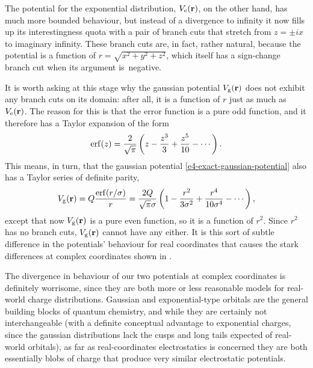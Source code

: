 The potential for the exponential distribution, $V_\mathrm{e}(\vb{r})$, on the other hand, has much more bounded behaviour, but instead of a divergence to infinity it now fills up its interestingness quota with a pair of branch cuts that stretch from $z=\pm i x$ to imaginary infinity. These branch cuts are, in fact, rather natural, because the potential is a function of $r=\sqrt{x^2+y^2+z^2}$, which itself has a sign-change branch cut when its argument is~negative. 


It is worth asking at this stage why the gaussian potential $V_\mathrm{g}(\vb{r})$ does not exhibit any branch cuts on its domain: after all, it is a function of $r$ just as much as $V_\mathrm{e}(\vb{r})$. The reason for this is that the error function is a pure odd function, and it therefore has a Taylor expansion  of the form
\begin{equation}
\erf(z)
=\frac{2}{\sqrt{\pi}}\left( z - \frac{z^3}{3} + \frac{z^5}{10} - \cdots \right)
.
\end{equation}
This means, in turn, that the gaussian potential \eqref{e4-exact-gaussian-potential} also has a Taylor series of definite parity,
\begin{equation}
\Vg(\vbr) 
=
Q \frac{ \erf(r/\sigma) }{ r }
=
\frac{2Q}{\sqrt{\pi}\sigma}\left( 1 - \frac{r^2}{3\sigma^2} + \frac{r^4}{10\sigma^4} - \cdots \right)
,
\end{equation}
except that now $V_\mathrm{g}(\vb{r})$ is a pure even function, so it is a function of $r^2$. Since $r^2$ has no branch cuts, $V_\mathrm{g}(\vb{r})$ cannot have any either. It is this sort of subtle difference in the potentials' behaviour for real coordinates that causes the stark differences at complex coordinates shown in .


The divergence in behaviour of our two potentials at complex coordinates is definitely worrisome, since they are both more or less reasonable models for real-world charge distributions. Gaussian and exponential-type orbitals are the general building blocks of quantum chemistry, and while they are certainly not interchangeable (with a definite conceptual advantage to exponential charges, since the gaussian distributions lack the cusps and long tails expected of real-world orbitals), as far as real-coordinates electrostatics is concerned they are both essentially blobs of charge that produce very similar electrostatic potentials. 


